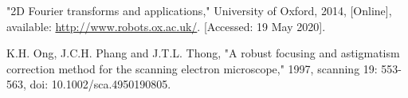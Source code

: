 \documentclass[12pt, conference]{IEEEtran}
\begin{document}
\begin{thebibliography}{00}

    "2D Fourier transforms and applications," University of Oxford, 2014, [Online], available: \url{http://www.robots.ox.ac.uk/}. [Accessed: 19 May 2020].

    
    K.H. Ong, J.C.H. Phang and J.T.L. Thong, "A robust focusing and astigmatism correction method for the scanning electron microscope," 1997, scanning 19: 553-563, doi: 10.1002/sca.4950190805.

\end{thebibliography}
\end{document}
